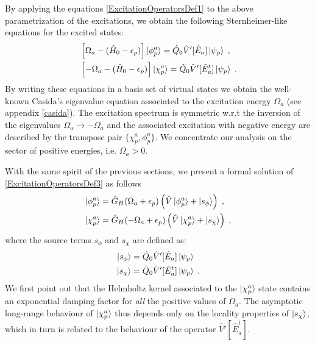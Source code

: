 \documentclass[reprint,aps,prb]{revtex4-1}
\newcommand{\eps}{\epsilon}
\newcommand{\nn}{\notag}
\newcommand{\lb}{\label}
\newcommand{\op}[1]{\hat {#1}}
\newcommand{\sop}[1]{\op{\op {#1}}}
\newcommand{\hnot}{\op{H}_0}
\newcommand{\Liouv}{\sop{\mathcal L}}
\begin{document}
By applying the equations \eqref{ExcitationOperatorsDef1} to the above parametrization
of the excitations, we obtain the following Sternheimer-like equations for the excited states:
\begin{align}\lb{ExcitationOperatorsDef3}
&\left[\Omega_a-(\hnot - \eps_p)\right] \ket{\phi_p^a} = \op Q_0 \op V'[\op E_a] \ket{\psi_p} \;, \nn\\
&\left[-\Omega_a-(\hnot - \eps_p)\right]\ket{\chi_p^a} = \op Q_0\op V'[\op E^t_a]\ket{\psi_p}  \;.
\end{align}
By writing these equations in a basis set of virtual states we obtain the well-known Casida's eigenvalue equation
associated to the excitation energy $\Omega_a$ (see appendix \ref{casida}).
The excitation spectrum is symmetric w.r.t the inversion of the eigenvalues 
$\Omega_a \rightarrow -\Omega_a$ and the associated excitation with negative energy are described by the transpose pair $\{\chi^a_p,\phi^a_p\}$.
We concentrate our analysis on the sector of positive energies, i.e. $\Omega_a > 0$.

With the same spirit of the previous sections, we present a formal solution of \eqref{ExcitationOperatorsDef3} as follows 
\begin{align}
\ket{\phi^a_p} &= \op G_H(\Omega_a+\eps_p)\left(\op V \ket{\phi^a_p} + \ket{s_{\phi}} \right) \;, \nn \\
\ket{\chi^a_p} &= \op G_H(-\Omega_a+\eps_p)\left( \op V \ket{\chi^a_p} + \ket{s_{\chi}} \right)\;,
\end{align}
where the source terms $s_\phi$ and $s_{\chi}$ are defined as:
\begin{align}
 \ket{s_{\phi}} &=  \op Q_0 \op V'[\op E_a] \ket{\psi_p} \nn \\
 \ket{s_{\chi}} &=  \op Q_0 \op V'[\op E^t_a] \ket{\psi_p}\;.
\end{align}
We first point out that the Helmholtz kernel associated to the $\ket{\chi^a_p}$ state 
contains an exponential damping factor for \emph{all} the positive values of $\Omega_a$.
The asymptotic long-range behaviour of $\ket{\chi^a_p}$ thus depends only on the locality properties of 
$\ket{s_{\chi}}$, which in turn is related to the behaviour of the operator $\op V'[\op E^t_a]$.
\end{document}
